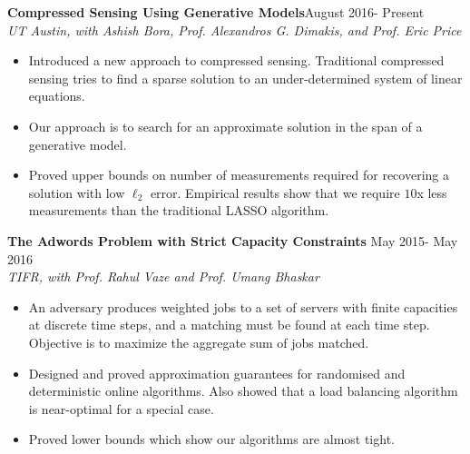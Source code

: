 \documentclass[margin, 11pt]{res} %
\begin{document}
\begin{resume}
{\bf Compressed Sensing Using Generative Models}\hfill August 2016- Present\\
{\sl UT Austin, with Ashish Bora, Prof. Alexandros G. Dimakis, and Prof. Eric Price}
\begin{itemize}\itemsep -2pt
	\item Introduced a new approach to compressed sensing. Traditional compressed sensing tries to find a sparse solution to an under-determined system of linear equations.
	\item Our approach is to search for an approximate solution in the span of a generative model.
	\item Proved upper bounds on number of measurements required for recovering a solution with low $\ell_2$ error. Empirical results show that we require $10$x less measurements than the traditional LASSO algorithm.
\end{itemize}

{\bf The Adwords Problem with Strict Capacity Constraints} \hfill May 2015- May 2016\\
{\sl TIFR, with Prof. Rahul Vaze and Prof. Umang Bhaskar}
\begin{itemize}\itemsep -2pt
	\item An adversary produces weighted jobs to a set of servers with finite capacities at discrete	time steps, and a matching must be found at each time step. Objective is to maximize the aggregate sum of jobs matched.
	\item Designed and proved approximation guarantees for randomised and deterministic online algorithms. Also showed that a load balancing algorithm is near-optimal for a special case.
	\item Proved lower bounds which show our algorithms are almost tight.
\end{itemize}

\begin{comment}
{\bf Text Dependent Automatic Speaker Recognition} \hfill Summer 2014\\
{\sl Audience Communication Systems, with Murali Deshpande and Vinay N Krishnan}
\begin{itemize}\itemsep -2pt
\item Implemented an adaptive Gaussian Mixture Model which can be trained to recognise a particular
keyphrase by a 	user. Can be used as part of a voice activated wake up feature for
cellphones.
\item Model uses approximately 10 seconds of training data per user and achieves 80\%+ accuracy.
\end{itemize}
\end{comment}


\end{resume}
\end{document}
